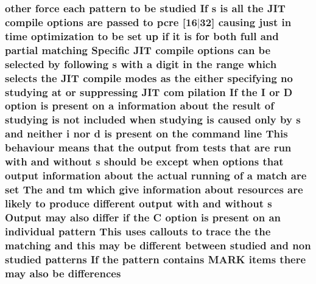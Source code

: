\subsubsection[{\texorpdfstring{differences}{differences}}]{ other force each {\bf pattern} {\bf to} {\bf be} {\bf studied} If {\bf s} {\bf is} {\bf all} the J\+IT {\bf compile} {\bf options} {\bf are} passed {\bf to} {\bf pcre} \mbox{[}16$\vert$32\mbox{]} causing just {\bf in} {\bf time} optimization {\bf to} {\bf be} {\bf set} up {\bf if} {\bf it} {\bf is} for both full and {\bf partial} {\bf matching} Specific J\+IT {\bf compile} {\bf options} {\bf can} {\bf be} {\bf selected} by following {\bf s} {\bf with} {\bf a} digit {\bf in} the range {\bf which} selects the J\+IT {\bf compile} {\bf modes} {\bf as} the either {\bf specifying} no {\bf studying} at {\bf or} suppressing J\+IT com pilation If the {\bf I} {\bf or} {\bf D} {\bf option} {\bf is} {\bf present} {\bf on} {\bf a} information about the {\bf result} {\bf of} {\bf studying} {\bf is} {\bf not} {\bf included} when {\bf studying} {\bf is} caused only by {\bf s} and neither {\bf i} nor {\bf d} {\bf is} {\bf present} {\bf on} the {\bf command} {\bf line} This behaviour means that the {\bf output} {\bf from} {\bf tests} that {\bf are} {\bf run} {\bf with} and without {\bf s} should {\bf be} {\bf except} when {\bf options} that {\bf output} information about the actual running {\bf of} {\bf a} {\bf match} {\bf are} {\bf set} The and {\bf tm} {\bf which} give information about resources {\bf are} likely {\bf to} produce different {\bf output} {\bf with} and without {\bf s} Output may also differ {\bf if} the {\bf C} {\bf option} {\bf is} {\bf present} {\bf on} an individual {\bf pattern} This uses callouts {\bf to} trace the the {\bf matching} and {\bf this} may {\bf be} different between {\bf studied} and non {\bf studied} {\bf patterns} If the {\bf pattern} {\bf contains} M\+A\+RK items there may also {\bf be} differences}\hypertarget{pcretest_8txt_ae0b4827911f3ad8968eb20a06daec339}{}\label{pcretest_8txt_ae0b4827911f3ad8968eb20a06daec339}
